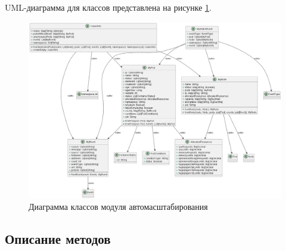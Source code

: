   UML-диаграмма для классов представлена на рисунке \ref{fig:uml3}.
  
  \begin{figure}[h]
   \centering
   \includegraphics[scale=0.3]{img/7.png}
   \caption{Диаграмма классов модуля автомасштабирования}
   \label{fig:uml3}
  \end{figure}
  
  \subsection{Описание методов}
  
